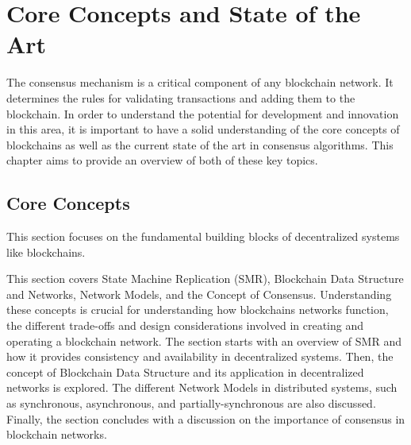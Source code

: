 \chapter{Core Concepts and State of the Art}

The consensus mechanism is a critical component of any blockchain network. It determines the rules for validating transactions and adding them to the blockchain. In order to understand the potential for development and innovation in this area, it is important to have a solid understanding of the core concepts of blockchains as well as the current state of the art in consensus algorithms. This chapter aims to provide an overview of both of these key topics.

\section{Core Concepts}
This section focuses on the fundamental building blocks of decentralized systems like blockchains.

This section covers State Machine Replication (SMR), Blockchain Data Structure and Networks, Network Models, and the Concept of Consensus.
Understanding these concepts is crucial for understanding how blockchains networks function, the different trade-offs and design considerations involved in creating and operating a blockchain network. The section starts with an overview of SMR and how it provides consistency and availability in decentralized systems.
Then, the concept of Blockchain Data Structure and its application in decentralized networks is explored. The different Network Models in distributed systems, such as synchronous, asynchronous, and partially-synchronous are also discussed. Finally, the section concludes with a discussion on the importance of consensus in blockchain networks.


